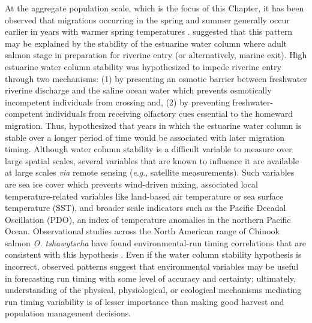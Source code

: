 \documentclass[12pt,]{book}
\theoremstyle{definition}
\theoremstyle{definition}
\theoremstyle{definition}
\theoremstyle{remark}
\begin{document}
At the aggregate population scale, which is the focus of this Chapter,
it has been observed that migrations occurring in the spring and summer
generally occur earlier in years with warmer spring temperatures
\citep{mundy-evenson-2011, hodgson-etal-2006}.
\citet{mundy-evenson-2011} suggested that this pattern may be explained
by the stability of the estuarine water column where adult salmon stage
in preparation for riverine entry (or alternatively, marine exit). High
estuarine water column stability was hypothesized to impede riverine
entry through two mechanisms: (1) by presenting an osmotic barrier
between freshwater riverine discharge and the saline ocean water which
prevents osmotically incompetent individuals from crossing and, (2) by
preventing freshwater-competent individuals from receiving olfactory
cues essential to the homeward migration. Thus,
\citet{mundy-evenson-2011} hypothesized that years in which the
estuarine water column is stable over a longer period of time would be
associated with later migration timing. Although water column stability
is a difficult variable to measure over large spatial scales, several
variables that are known to influence it are available at large scales
\emph{via} remote sensing (\emph{e}.\emph{g}., satellite measurements).
Such variables are sea ice cover which prevents wind-driven mixing,
associated local temperature-related variables like land-based air
temperature or sea surface temperature (SST), and broader scale
indicators such as the Pacific Decadal Oscillation (PDO), an index of
temperature anomalies in the northern Pacific Ocean. Observational
studies across the North American range of Chinook salmon \emph{O.
tshawytscha} have found environmental-run timing correlations that are
consistent with this hypothesis
\citep{hodgson-etal-2006, keefer-etal-2008, mundy-evenson-2011}. Even if
the water column stability hypothesis is incorrect, observed patterns
suggest that environmental variables may be useful in forecasting run
timing with some level of accuracy and certainty; ultimately,
understanding of the physical, physiological, or ecological mechanisms
mediating run timing variability is of lesser importance than making
good harvest and population management decisions.
\end{document}
